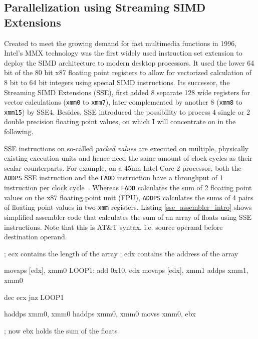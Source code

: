\subsection{Parallelization using Streaming SIMD Extensions}
Created to meet the growing demand for fast multimedia functions in 1996, Intel's MMX technology was the first widely used instruction set extension to deploy the SIMD architecture to modern desktop processors. It used the lower 64 bit of the 80 bit x87 floating point registers to allow for vectorized calculation of 8 bit to 64 bit integers using special SIMD instructions. Its successor, the Streaming SIMD Extensions (SSE), first added 8 separate 128 wide registers for vector calculations (\texttt{xmm0} to \texttt{xmm7}), later complemented by another 8 (\texttt{xmm8} to \texttt{xmm15}) by SSE4. Besides, SSE introduced the possibility to process 4 single or 2 double precision floating point values, on which I will concentrate on in the following.

SSE instructions on so-called \emph{packed values} are executed on multiple, physically existing execution units and hence need the same amount of clock cycles as their scalar counterparts. For example, on a 45nm Intel Core 2 processor, both the \texttt{ADDPS} SSE instruction and the \texttt{FADD} instruction have a throughput of 1 instruction per clock cycle~\cite[pp. 50, 57]{fog2011instructiontables}. Whereas \texttt{FADD} calculates the sum of 2 floating point values on the x87 floating point unit (FPU), \texttt{ADDPS} calculates the sums of 4 pairs of floating point values in two \texttt{xmm} registers. Listing \ref{sse_assembler_intro} shows simplified assembler code that calculates the sum of an array of floats using SSE instructions. Note that this is AT\&T syntax, i.e. source operand before destination operand.
\begin{assembler}[caption={Array sum using simplified SSE assembly}, label=sse_assembler_intro]
  ; ecx contains the length of the array
  ; edx contains the address of the array

  movaps [edx], xmm0
LOOP1:
  add    0x10, edx
  movaps [edx], xmm1
  addps  xmm1, xmm0

  dec    ecx
  jnz    LOOP1

  haddps xmm0, xmm0
  haddps xmm0, xmm0
  movss  xmm0, ebx

  ; now ebx holds the sum of the floats
\end{assembler}


